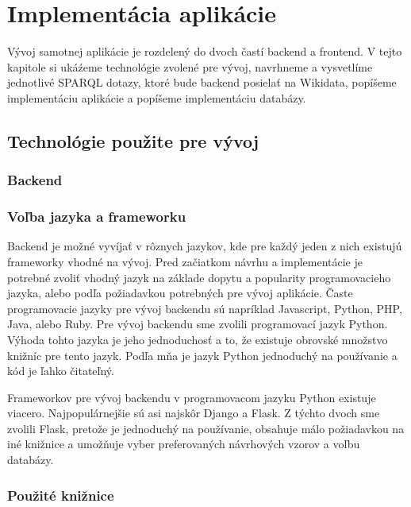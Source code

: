 
\chapter{Implementácia aplikácie}

Vývoj samotnej aplikácie je rozdelený do dvoch častí backend a frontend. V tejto kapitole si ukáźeme technológie zvolené pre vývoj,
navrhneme a vysvetlíme jednotlivé SPARQL dotazy, ktoré bude backend posielať na Wikidata, popíšeme implementáciu aplikácie a popíšeme implementáciu databázy. 

\section{Technológie použite pre vývoj}

\subsection{Backend}

\subsection*{Voľba jazyka a frameworku }

Backend je možné vyvíjať v rôznych jazykov, kde pre každý jeden z nich existujú frameworky vhodné na vývoj. Pred začiatkom návrhu a implementácie je potrebné zvoliť vhodný jazyk na základe 
dopytu a popularity programovacieho jazyka, alebo podľa požiadavkou potrebných pre vývoj aplikácie. Časte programovacie jazyky pre vývoj backendu sú napríklad Javascript, Python, PHP, Java, alebo Ruby. 
Pre vývoj backendu sme zvolili programovací jazyk Python. Výhoda tohto jazyka je jeho jednoduchosť a to, že existuje obrovské množstvo knižníc pre tento jazyk. 
Podľa mňa je jazyk Python jednoduchý na používanie a kód je ľahko čitateľný. 

Frameworkov pre vývoj backendu v programovacom jazyku Python existuje viacero. Najpopulárnejšie sú asi najskôr Django a Flask. Z týchto dvoch sme zvolili Flask, pretože 
je jednoduchý na používanie, obsahuje málo požiadavkou na iné knižnice a umožňuje vyber preferovaných návrhových vzorov a voľbu databázy. 

\subsection*{Použité knižnice}

